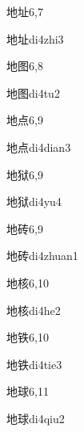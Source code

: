 \begin{entry}{地址}{6,7}
  \begin{phonetics}{地址}{di4zhi3}
  \end{phonetics}
\end{entry}

\begin{entry}{地图}{6,8}
  \begin{phonetics}{地图}{di4tu2}
  \end{phonetics}
\end{entry}

\begin{entry}{地点}{6,9}
  \begin{phonetics}{地点}{di4dian3}
  \end{phonetics}
\end{entry}

\begin{entry}{地狱}{6,9}
  \begin{phonetics}{地狱}{di4yu4}
  \end{phonetics}
\end{entry}

\begin{entry}{地砖}{6,9}
  \begin{phonetics}{地砖}{di4zhuan1}
  \end{phonetics}
\end{entry}

\begin{entry}{地核}{6,10}
  \begin{phonetics}{地核}{di4he2}
  \end{phonetics}
\end{entry}

\begin{entry}{地铁}{6,10}
  \begin{phonetics}{地铁}{di4tie3}
  \end{phonetics}
\end{entry}

\begin{entry}{地球}{6,11}
  \begin{phonetics}{地球}{di4qiu2}
  \end{phonetics}
\end{entry}

